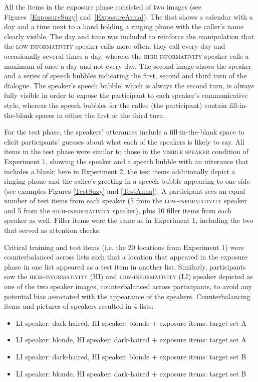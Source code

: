 \documentclass[output=paper,colorlinks,citecolor=brown]{langscibook}
\begin{document}
All the items in the exposure phase consisted of two images (see Figures~\ref{ExposureSuzy} and~\ref{ExposureAnna}). The first shows a calendar with a day and a time next to a hand holding a ringing phone with the caller’s name clearly visible. The day and time was included to reinforce the manipulation that the \textsc{low-informativity} speaker calls more often; they call every day and occasionally several times a day, whereas the \textsc{high-informativity} speaker calls a maximum of once a day and not every day. The second image shows the speaker and a series of speech bubbles indicating the first, second and third turn of the dialogue. The speaker’s speech bubble, which is always the second turn, is always fully visible in order to expose the participant to each speaker’s communicative style, whereas the speech bubbles for the callee (the participant) contain fill-in-the-blank spaces in either the first or the third turn.
 
For the test phase, the speakers’ utterances include a fill-in-the-blank space to elicit participants’ guesses about what each of the speakers is likely to say. All items in the test phase were similar to those in the \textsc{visible speaker} condition of Experiment 1, showing the speaker and a speech bubble with an utterance that includes a blank; here in Experiment 2, the test items additionally depict a ringing phone and the callee’s greeting in a speech bubble appearing to one side (see examples Figures \ref{TestSuzy} and \ref{TestAnna}). A participant sees an equal number of test items from each speaker (5 from the \textsc{low-informativity} speaker and 5 from the \textsc{high-informativity} speaker), plus 10 filler items from each speaker as well. Filler items were the same as in Experiment 1, including the two that served as attention checks.
 
Critical training and test items (i.e. the 20 locations from Experiment 1) were counterbalanced across lists such that a location that appeared in the exposure phase in one list appeared as a test item in another list. Similarly, participants saw the \textsc{high-informativity} (HI) and \textsc{low-informativity} (LI) speaker depicted as one of the two speaker images, counterbalanced across participants, to avoid any potential bias associated with the appearance of the speakers. Counterbalancing items and pictures of speakers resulted in 4 lists:
\begin{itemize}
    \item LI speaker: dark-haired, HI speaker: blonde + exposure items: target set A
    \item LI speaker: blonde, HI speaker: dark-haired + exposure items: target set A
    \item LI speaker: dark-haired, HI speaker: blonde + exposure items: target set B
    \item LI speaker: blonde, HI speaker: dark-haired + exposure items: target set B
\end{itemize}
\end{document}
